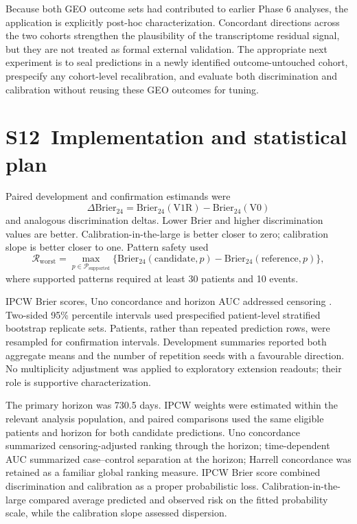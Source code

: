 Because both GEO outcome sets had contributed to earlier Phase 6 analyses, the application is explicitly post-hoc characterization. Concordant directions across the two cohorts strengthen the plausibility of the transcriptome residual signal, but they are not treated as formal external validation. The appropriate next experiment is to seal predictions in a newly identified outcome-untouched cohort, prespecify any cohort-level recalibration, and evaluate both discrimination and calibration without reusing these GEO outcomes for tuning.

\section*{S12~Implementation and statistical plan}
Paired development and confirmation estimands were
\begin{equation}
\Delta\mathrm{Brier}_{24}=\mathrm{Brier}_{24}(\mathrm{V1R})-\mathrm{Brier}_{24}(\mathrm{V0})
\end{equation}
and analogous discrimination deltas. Lower Brier and higher discrimination values are better. Calibration-in-the-large is better closer to zero; calibration slope is better closer to one. Pattern safety used
\begin{equation}
\mathcal{R}_{\mathrm{worst}}=\max_{p\in\mathcal{P}_{\mathrm{supported}}}
\{\mathrm{Brier}_{24}(\mathrm{candidate},p)-\mathrm{Brier}_{24}(\mathrm{reference},p)\},
\end{equation}
where supported patterns required at least 30 patients and 10 events.

IPCW Brier scores, Uno concordance and horizon AUC addressed censoring \cite{graf1999,uno2011}. Two-sided 95\% percentile intervals used prespecified patient-level stratified bootstrap replicate sets. Patients, rather than repeated prediction rows, were resampled for confirmation intervals. Development summaries reported both aggregate means and the number of repetition seeds with a favourable direction. No multiplicity adjustment was applied to exploratory extension readouts; their role is supportive characterization.

The primary horizon was 730.5 days. IPCW weights were estimated within the relevant analysis population, and paired comparisons used the same eligible patients and horizon for both candidate predictions. Uno concordance summarized censoring-adjusted ranking through the horizon; time-dependent AUC summarized case--control separation at the horizon; Harrell concordance was retained as a familiar global ranking measure. IPCW Brier score combined discrimination and calibration as a proper probabilistic loss. Calibration-in-the-large compared average predicted and observed risk on the fitted probability scale, while the calibration slope assessed dispersion.

